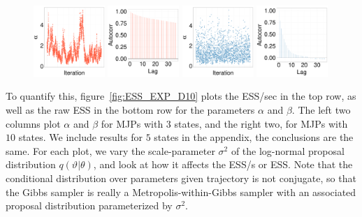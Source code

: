 \begin{figure}[H]
\begin{minipage}[!hp]{0.97\linewidth}
    \includegraphics [width=0.24\textwidth, angle=0]{figs/EXP_ks/exp_traceGBS_44_05_10_.pdf}
    \includegraphics [width=0.24\textwidth, angle=0]{figs/EXP_ks/exp_gbsacf_44_05_10_.pdf}
    \includegraphics [width=0.24\textwidth, angle=0]{figs/EXP_ks/exp_traceMH_44_05_10_.pdf}
    \includegraphics [width=0.24\textwidth, angle=0]{figs/EXP_ks/exp_mhacf_44_05_10_.pdf}
  \end{minipage}
  \end{figure}
  To quantify this, figure~\ref{fig:ESS_EXP_D10} plots the ESS/sec in the top row, as well as the raw ESS in the bottom row for the parameters $\alpha$  and $\beta$. 
  The left two columns plot $\alpha$ and $\beta$ for MJPs with $3$ states, and the right two, for MJPs with $10$ states. 
  We include results for $5$ states in the appendix, the conclusions are the same. 
  For each plot, we vary the scale-parameter $\sigma^2$ of the log-normal proposal distribution $q(\vartheta|\theta)$, and look at how it affects the ESS/s or ESS. 
  Note that the conditional distribution over parameters given trajectory is not conjugate, so that the Gibbs sampler is really a Metropolis-within-Gibbs sampler with an associated proposal distribution parameterized by $\sigma^2$.
